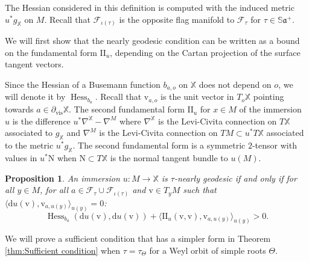 \documentclass[reqno,10pt]{amsart}
\theoremstyle{plain}
\newtheorem{prop}[thm]{Proposition}
\theoremstyle{definition}
\theoremstyle{remark}
\newcommand{\type}{\tau}
\newcommand{\Sph}{\mathbb{S}}
\DeclareMathOperator{\vis}{vis}
\newcommand{\partialvis}{\partial_{\vis}}
\DeclareMathOperator{\Hess}{Hess}
\newcommand{\II}{\mathrm{I\!I}}
\newcommand{\X}{\mathbb{X}}
\begin{document}
The Hessian considered in this definition is computed with the induced metric $u^*g_\X$ on $M$. Recall that $\mathcal{F}_{\iota(\type)}$ is the opposite flag manifold to $\mathcal{F}_{\type}$ for $\type\in \Sph\mathfrak{a}^+$.

\medskip

We will first show that the nearly geodesic condition can be written as a bound on the fundamental form $\II_u$, depending on the Cartan projection of the surface tangent vectors. 

\medskip

Since the Hessian of a Busemann function $b_{a,o}$ on $\X$ does not depend on $o$, we will denote it by $\Hess_{b_a}$. Recall that $\mathrm{v}_{a,o}$ is the unit vector in $T_o\X$ pointing towards $a\in \partialvis \X$. The second fundamental form $\II_u$ for $x\in M$ of the immersion $u$ is the difference $u^*\nabla^\X-\nabla^M$ where $\nabla^\X$ is the Levi-Civita connection on $T\X$ associated to $g_\X$ and $\nabla^M$ is the Levi-Civita connection on $TM\subset u^*T\X$ associated to the metric $u^*g_\X$. The second fundamental form is a symmetric $2$-tensor with values in $u^*\mathrm{N}$ when $\mathrm{N}\subset T\X$ is the normal tangent bundle to $u(M)$.


\begin{prop}
\label{prop:nearlyfuchsianLocalProp}
An immersion $u:M\to \X$ is $\type$-nearly geodesic if and only if for all $y\in M$, for all $a\in \mathcal{F}_\type\cup \mathcal{F}_{\iota(\type)}$ and $\mathrm{v}\in T_yM$ such that $\langle \mathrm{d}u(\mathrm{v}),\mathrm{v}_{a,u(y)}\rangle_{u(y)}=0$:
\begin{equation}
\label{eq:HessianNearlyfuchsian}
\Hess_{b_a}(\mathrm{d}u(\mathrm{v}),\mathrm{d}u(\mathrm{v}))+\langle\II_u(\mathrm{v},\mathrm{v}),\mathrm{v}_{a,u(y)}\rangle_{u(y)}>0. \end{equation}
\end{prop}

We will prove a sufficient condition that has a simpler form in Theorem \ref{thm:Sufficient condition} when $\type=\type_\Theta$ for a Weyl orbit of simple roots $\Theta$.

\medskip
\end{document}
